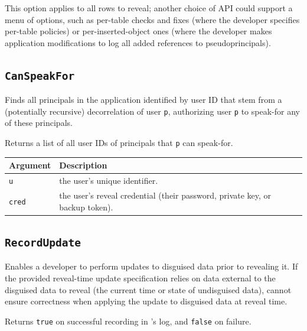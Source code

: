 This option applies to all rows to reveal; another choice of API
could support a menu of options, such as per-table checks and fixes
(where the developer specifies per-table policies) or
per-inserted-object ones (where the developer makes application
modifications to log all added references to pseudoprincipals).

\subsection{\texttt{CanSpeakFor}}
    Finds all principals in the application identified by user ID that stem from
    a (potentially recursive) decorrelation of user \texttt{p}, authorizing user \texttt{p}
    to speak-for any of these principals. 

    Returns a list of all user IDs of principals that \texttt{p} can speak-for.

\begin{center}
    \begin{longtable}{|m{}|m{}|}
        \hline
        \textbf{Argument} & \textbf{Description} \\
        \hline
             \texttt{u}& the user's unique identifier. \\
        \hline
             \texttt{cred}& the user's reveal credential (their password, private key, or
    backup token).\\
        \hline
    \end{longtable}
    \end{center}
   
    
\subsection{\texttt{RecordUpdate}}
\label{s:semantics:updates}

Enables a developer to perform updates to disguised data prior to revealing it.
If the provided reveal-time update specification relies on data external to the
disguised data to reveal (\eg the current time or state of undisguised data),
\sys cannot ensure correctness when applying the update to disguised data at
reveal time.

Returns \texttt{true} on successful recording in \sys's
    log, and \texttt{false} on failure.

